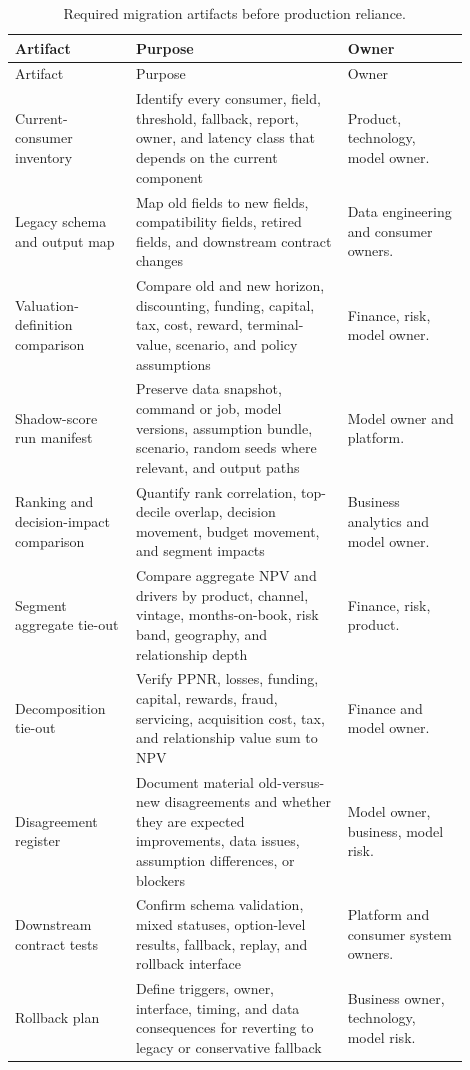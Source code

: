 \documentclass[11pt]{article}
\newcommand{\1}{\mathbf{1}}
\begin{document}
\begin{longtable}{L{0.24\linewidth}L{0.42\linewidth}L{0.24\linewidth}}
\caption{Required migration artifacts before production reliance.}
\label{tab:migration-artifacts}\\
\toprule
Artifact & Purpose & Owner \\
\midrule
\endfirsthead
\toprule
Artifact & Purpose & Owner \\
\midrule
\endhead
Current-consumer inventory
  & Identify every consumer, field, threshold, fallback, report, owner, and
    latency class that depends on the current component
  & Product, technology, model owner. \\
Legacy schema and output map
  & Map old fields to new fields, compatibility fields, retired fields, and
    downstream contract changes
  & Data engineering and consumer owners. \\
Valuation-definition comparison
  & Compare old and new horizon, discounting, funding, capital, tax, cost,
    reward, terminal-value, scenario, and policy assumptions
  & Finance, risk, model owner. \\
Shadow-score run manifest
  & Preserve data snapshot, command or job, model versions, assumption bundle,
    scenario, random seeds where relevant, and output paths
  & Model owner and platform. \\
Ranking and decision-impact comparison
  & Quantify rank correlation, top-decile overlap, decision movement, budget
    movement, and segment impacts
  & Business analytics and model owner. \\
Segment aggregate tie-out
  & Compare aggregate NPV and drivers by product, channel, vintage,
    months-on-book, risk band, geography, and relationship depth
  & Finance, risk, product. \\
Decomposition tie-out
  & Verify PPNR, losses, funding, capital, rewards, fraud, servicing,
    acquisition cost, tax, and relationship value sum to NPV
  & Finance and model owner. \\
Disagreement register
  & Document material old-versus-new disagreements and whether they are
    expected improvements, data issues, assumption differences, or blockers
  & Model owner, business, model risk. \\
Downstream contract tests
  & Confirm schema validation, mixed statuses, option-level results, fallback,
    replay, and rollback interface
  & Platform and consumer system owners. \\
Rollback plan
  & Define triggers, owner, interface, timing, and data consequences for
    reverting to legacy or conservative fallback
  & Business owner, technology, model risk. \\
\bottomrule
\end{longtable}
\end{document}

